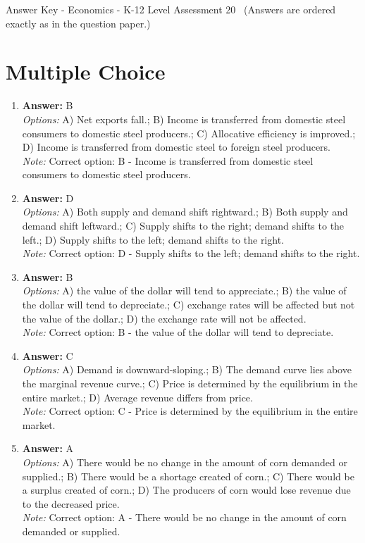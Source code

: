 \documentclass[12pt]{article}
\begin{document}
\begin{center}
Answer Key - Economics - K-12 Level Assessment 20 \
\small (Answers are ordered exactly as in the question paper.)
\end{center}

\section*{Multiple Choice}
\begin{enumerate}[label=\arabic*.]
\item \textbf{Answer:} B
\\ \textit{Options:} A) Net exports fall.; B) Income is transferred from domestic steel consumers to domestic steel producers.; C) Allocative efficiency is improved.; D) Income is transferred from domestic steel to foreign steel producers.
\\ \textit{Note:} Correct option: B - Income is transferred from domestic steel consumers to domestic steel producers.
\item \textbf{Answer:} D
\\ \textit{Options:} A) Both supply and demand shift rightward.; B) Both supply and demand shift leftward.; C) Supply shifts to the right; demand shifts to the left.; D) Supply shifts to the left; demand shifts to the right.
\\ \textit{Note:} Correct option: D - Supply shifts to the left; demand shifts to the right.
\item \textbf{Answer:} B
\\ \textit{Options:} A) the value of the dollar will tend to appreciate.; B) the value of the dollar will tend to depreciate.; C) exchange rates will be affected but not the value of the dollar.; D) the exchange rate will not be affected.
\\ \textit{Note:} Correct option: B - the value of the dollar will tend to depreciate.
\item \textbf{Answer:} C
\\ \textit{Options:} A) Demand is downward-sloping.; B) The demand curve lies above the marginal revenue curve.; C) Price is determined by the equilibrium in the entire market.; D) Average revenue differs from price.
\\ \textit{Note:} Correct option: C - Price is determined by the equilibrium in the entire market.
\item \textbf{Answer:} A
\\ \textit{Options:} A) There would be no change in the amount of corn demanded or supplied.; B) There would be a shortage created of corn.; C) There would be a surplus created of corn.; D) The producers of corn would lose revenue due to the decreased price.
\\ \textit{Note:} Correct option: A - There would be no change in the amount of corn demanded or supplied.
\end{enumerate}
\end{document}
